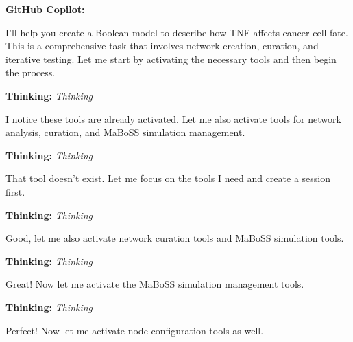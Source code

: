 \documentclass[11pt,a4paper]{article}
\begin{document}
\begin{copilotbox}
\textbf{GitHub Copilot:}

I'll help you create a Boolean model to describe how TNF affects cancer cell fate. This is a comprehensive task that involves network creation, curation, and iterative testing. Let me start by activating the necessary tools and then begin the process.

\end{copilotbox}
\begin{thinkbox}
\textbf{Thinking:} \textit{Thinking}

I notice these tools are already activated. Let me also activate tools for network analysis, curation, and MaBoSS simulation management.

\end{thinkbox}
\begin{thinkbox}
\textbf{Thinking:} \textit{Thinking}

That tool doesn't exist. Let me focus on the tools I need and create a session first.

\end{thinkbox}
\begin{thinkbox}
\textbf{Thinking:} \textit{Thinking}

Good, let me also activate network curation tools and MaBoSS simulation tools.

\end{thinkbox}
\begin{thinkbox}
\textbf{Thinking:} \textit{Thinking}

Great! Now let me activate the MaBoSS simulation management tools.

\end{thinkbox}
\begin{thinkbox}
\textbf{Thinking:} \textit{Thinking}

Perfect! Now let me activate node configuration tools as well.

\end{thinkbox}
\end{document}
